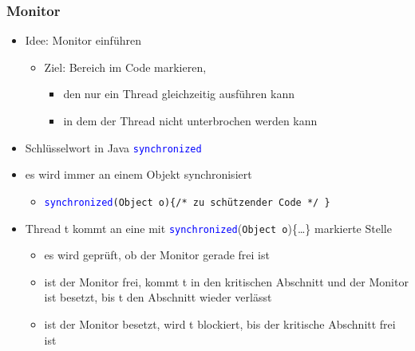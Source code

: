\documentclass[18pt]{beamer}
\begin{document}
	\begin{frame}
		\frametitle{Monitor}
		\begin{itemize}
			\item Idee: Monitor einführen \pause
			\begin{itemize}
				\item Ziel: Bereich im Code markieren,
				\begin{itemize}
					\item den nur ein Thread gleichzeitig ausführen kann
					\item in dem der Thread nicht unterbrochen werden kann
				\end{itemize}
			\end{itemize} \pause
			\item Schlüsselwort in Java \textcolor{blue}{\texttt{synchronized}} \pause
			\item es wird immer an einem Objekt synchronisiert
			\begin{itemize}
				\item \textcolor{blue}{\texttt{synchronized}}\texttt{(Object o)}\texttt{\{/* zu schützender Code */ \}} \pause
			\end{itemize} 
			\item Thread t kommt an eine mit \textcolor{blue}{\texttt{synchronized}}(\texttt{Object o})\{\dots\} markierte Stelle \pause
			\begin{itemize}
				\item es wird geprüft, ob der Monitor gerade frei ist \pause
				\item ist der Monitor frei, kommt t in den kritischen Abschnitt und der Monitor ist besetzt, bis t den Abschnitt wieder verlässt \pause
				\item ist der Monitor besetzt, wird t blockiert, bis der kritische Abschnitt frei ist
			\end{itemize}
		\end{itemize}
	\end{frame}
\end{document}
